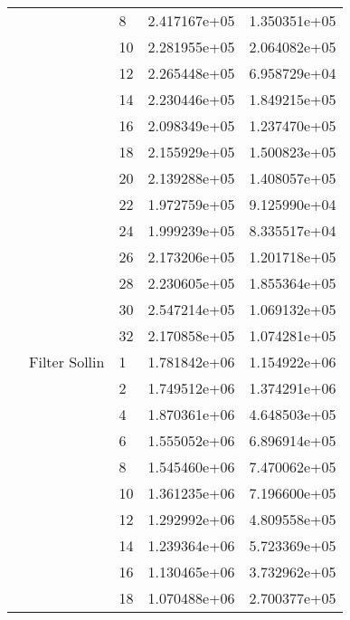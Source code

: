 \begin{tabular}{lllrr}
                      &            & 8  &  2.417167e+05 &  1.350351e+05 \\
                      &            & 10 &  2.281955e+05 &  2.064082e+05 \\
                      &            & 12 &  2.265448e+05 &  6.958729e+04 \\
                      &            & 14 &  2.230446e+05 &  1.849215e+05 \\
                      &            & 16 &  2.098349e+05 &  1.237470e+05 \\
                      &            & 18 &  2.155929e+05 &  1.500823e+05 \\
                      &            & 20 &  2.139288e+05 &  1.408057e+05 \\
                      &            & 22 &  1.972759e+05 &  9.125990e+04 \\
                      &            & 24 &  1.999239e+05 &  8.335517e+04 \\
                      &            & 26 &  2.173206e+05 &  1.201718e+05 \\
                      &            & 28 &  2.230605e+05 &  1.855364e+05 \\
                      &            & 30 &  2.547214e+05 &  1.069132e+05 \\
                      &            & 32 &  2.170858e+05 &  1.074281e+05 \\
                      & Filter Sollin & 1  &  1.781842e+06 &  1.154922e+06 \\
                      &            & 2  &  1.749512e+06 &  1.374291e+06 \\
                      &            & 4  &  1.870361e+06 &  4.648503e+05 \\
                      &            & 6  &  1.555052e+06 &  6.896914e+05 \\
                      &            & 8  &  1.545460e+06 &  7.470062e+05 \\
                      &            & 10 &  1.361235e+06 &  7.196600e+05 \\
                      &            & 12 &  1.292992e+06 &  4.809558e+05 \\
                      &            & 14 &  1.239364e+06 &  5.723369e+05 \\
                      &            & 16 &  1.130465e+06 &  3.732962e+05 \\
                      &            & 18 &  1.070488e+06 &  2.700377e+05 \\

\end{tabular}
